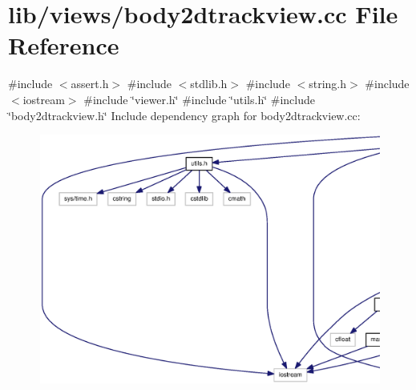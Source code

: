 \section{lib/views/body2dtrackview.cc \-File \-Reference}
\label{body2dtrackview_8cc}
{\ttfamily \#include $<$assert.\-h$>$}\*
{\ttfamily \#include $<$stdlib.\-h$>$}\*
{\ttfamily \#include $<$string.\-h$>$}\*
{\ttfamily \#include $<$iostream$>$}\*
{\ttfamily \#include \char`\"{}viewer.\-h\char`\"{}}\*
{\ttfamily \#include \char`\"{}utils.\-h\char`\"{}}\*
{\ttfamily \#include \char`\"{}body2dtrackview.\-h\char`\"{}}\*
\-Include dependency graph for body2dtrackview.\-cc\-:\nopagebreak
\begin{figure}[H]
\begin{center}
\leavevmode
\includegraphics[width=350pt]{body2dtrackview_8cc__incl}
\end{center}
\end{figure}

